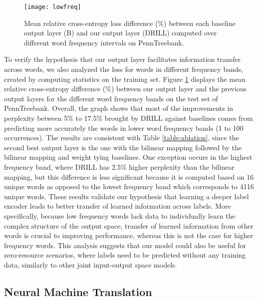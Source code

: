 \documentclass{article}
\begin{document}
\begin{figure}[htp]
\vspace{-3mm}
 	\centering
 	\hspace{-4mm}\texttt{[image: lowfreq]}
   \vspace{-7mm}
 	\caption{Mean relative cross-entropy loss difference (\%) between each baseline output layer (B) and our output layer (DRILL) computed over different word frequency intervals on PennTreebank.}
 	\label{lossdiff}
	\vspace{-4mm}
\end{figure}
To verify the hypothesis that our output layer facilitates information transfer across words, we also  analyzed the loss for words in different frequency bands, created by computing statistics on the training set. Figure \ref{lossdiff} displays the mean relative cross-entropy difference (\%) between our output layer and the previous output layers for the different word frequency bands on the test set of PennTreebank.  Overall, the graph shows that most of the improvements in perplexity between 5\% to 17.5\% brought by DRILL against baselines comes from predicting more accurately the words in lower word frequency bands (1 to 100 occurrences). The results are consistent with Table \ref{table:ablation}, since the second best output layer is the one with the bilinear mapping followed by the bilinear mapping and weight tying baselines. One exception occurs in the highest frequency band, where DRILL has 2.5\% higher perplexity than the bilinear mapping, but this difference is less significant because it is computed based on 16 unique words as opposed to the lowest frequency band which corresponds to 4116 unique words. 
These results validate our hypothesis that learning a deeper label encoder leads to better transfer of learned information across labels.  More specifically, because low frequency words lack data to individually learn the complex structure of the output space, transfer of learned information from other words is crucial to improving performance, whereas this is not the case for higher frequency words.
This analysis suggests that our model could also be useful for zero-resource scenarios, where labels need to be predicted without any training data, similarly to other joint input-output space models.




\subsection{Neural Machine Translation}
\label{nmt}
\end{document}
